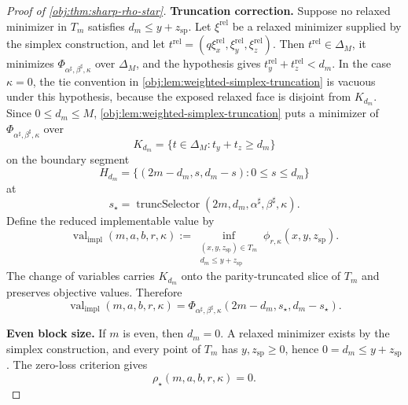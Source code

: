\begin{proof}[Proof of \cref{obj:thm:sharp-rho-star}]
\textbf{Truncation correction.}
Suppose no relaxed minimizer in \(T_m\) satisfies \(d_m\le y+z_{\mathrm{sp}}\).  Let \(\xi^{\mathrm{rel}}\) be a relaxed minimizer supplied by the simplex construction, and let \(t^{\mathrm{rel}}=(q\xi^{\mathrm{rel}}_x,\xi^{\mathrm{rel}}_y,\xi^{\mathrm{rel}}_z)\).  Then \(t^{\mathrm{rel}}\in\Delta_M\), it minimizes \(\Phi_{\alpha^\sharp,\beta^\sharp,\kappa}\) over \(\Delta_M\), and the hypothesis gives \(t^{\mathrm{rel}}_y+t^{\mathrm{rel}}_z<d_m\).  In the case \(\kappa=0\), the tie convention in \cref{obj:lem:weighted-simplex-truncation} is vacuous under this hypothesis, because the exposed relaxed face is disjoint from \(K_{d_m}\).  Since \(0\le d_m\le M\), \cref{obj:lem:weighted-simplex-truncation} puts a minimizer of \(\Phi_{\alpha^\sharp,\beta^\sharp,\kappa}\) over
\[
K_{d_m}=\{t\in\Delta_M:t_y+t_z\ge d_m\}
\]
on the boundary segment
\[
H_{d_m}=\{(2m-d_m,s,d_m-s):0\le s\le d_m\}
\]
at
\[
s_\star=\operatorname{truncSelector}(2m,d_m,\alpha^\sharp,\beta^\sharp,\kappa).
\]
Define the reduced implementable value by
\[
\operatorname{val}_{\mathrm{impl}}(m,a,b,r,\kappa)
:=
\inf_{\substack{(x,y,z_{\mathrm{sp}})\in T_m\\ d_m\le y+z_{\mathrm{sp}}}}
\phi_{r,\kappa}(x,y,z_{\mathrm{sp}}).
\]
The change of variables carries \(K_{d_m}\) onto the parity-truncated slice of \(T_m\) and preserves objective values.  Therefore
\[
\operatorname{val}_{\mathrm{impl}}(m,a,b,r,\kappa)
=
\Phi_{\alpha^\sharp,\beta^\sharp,\kappa}
(2m-d_m,s_\star,d_m-s_\star).
\]

\textbf{Even block size.}
If \(m\) is even, then \(d_m=0\).  A relaxed minimizer exists by the simplex construction, and every point of \(T_m\) has \(y,z_{\mathrm{sp}}\ge0\), hence \(0=d_m\le y+z_{\mathrm{sp}}\).  The zero-loss criterion gives
\[
\rho_\star(m,a,b,r,\kappa)=0 .
\]
\end{proof}
